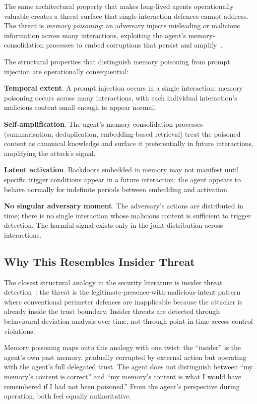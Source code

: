 \documentclass[sigconf,nonacm]{acmart}
\begin{document}
The same architectural property that makes long-lived agents
operationally valuable creates a threat surface that single-interaction
defences cannot address. The threat is \emph{memory poisoning}: an
adversary injects misleading or malicious information across many
interactions, exploiting the agent's memory-consolidation processes
to embed corruptions that persist and amplify~\cite{chen2024memorypoisoning,
zhao2025agentbackdoor}.

The structural properties that distinguish memory poisoning from
prompt injection are operationally consequential:

\textbf{Temporal extent}. A prompt injection occurs in a single
interaction; memory poisoning occurs across many interactions, with
each individual interaction's malicious content small enough to
appear normal.

\textbf{Self-amplification}. The agent's memory-consolidation processes
(summarisation, deduplication, embedding-based retrieval) treat the
poisoned content as canonical knowledge and surface it preferentially
in future interactions, amplifying the attack's signal.

\textbf{Latent activation}. Backdoors embedded in memory may not
manifest until specific trigger conditions appear in a future
interaction; the agent appears to behave normally for indefinite
periods between embedding and activation.

\textbf{No singular adversary moment}. The adversary's actions are
distributed in time; there is no single interaction whose malicious
content is sufficient to trigger detection. The harmful signal
exists only in the joint distribution across interactions.

\subsection{Why This Resembles Insider Threat}

The closest structural analogy in the security literature is insider
threat detection~\cite{liu2024insidersurv,carnegiemellon2024cert}:
the threat is the legitimate-presence-with-malicious-intent pattern
where conventional perimeter defences are inapplicable because the
attacker is already inside the trust boundary. Insider threats are
detected through behavioural deviation analysis over time, not
through point-in-time access-control violations.

Memory poisoning maps onto this analogy with one twist: the
``insider'' is the agent's own past memory, gradually corrupted by
external action but operating with the agent's full delegated trust.
The agent does not distinguish between ``my memory's content is
correct'' and ``my memory's content is what I would have remembered
if I had not been poisoned.'' From the agent's perspective during
operation, both feel equally authoritative.
\end{document}
